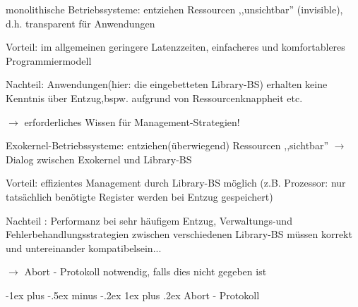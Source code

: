\documentclass[a4paper]{article}
\makeatletter
\renewcommand{\subsubsection}{\@startsection{subsubsection}{3}{0mm}%
 {-1ex plus -.5ex minus -.2ex}%
 {1ex plus .2ex}%
 {\normalfont\small\bfseries}}
\makeatother
\begin{document}
\begin{multicols}{3}
    \begin{itemize*}
        \item
        monolithische Betriebssysteme: entziehen Ressourcen ,,unsichtbar''
        (invisible), d.h. transparent für Anwendungen
        \begin{itemize*}
            \item Vorteil: im allgemeinen geringere Latenzzeiten, einfacheres und komfortableres Programmiermodell
            \item Nachteil: Anwendungen(hier: die eingebetteten Library-BS) erhalten keine Kenntnis über Entzug,bspw. aufgrund von Ressourcenknappheit etc.
            \item $\rightarrow$ erforderliches Wissen für Management-Strategien!
        \end{itemize*}
        \item
        Exokernel-Betriebssysteme: entziehen(überwiegend) Ressourcen
        ,,sichtbar'' $\rightarrow$ Dialog zwischen Exokernel
        und Library-BS
        \begin{itemize*}
            \item Vorteil: effizientes Management durch Library-BS möglich (z.B. Prozessor: nur tatsächlich benötigte Register werden bei Entzug gespeichert)
            \item Nachteil : Performanz bei sehr häufigem Entzug, Verwaltungs-und Fehlerbehandlungsstrategien zwischen verschiedenen Library-BS müssen korrekt und untereinander kompatibelsein...
            \item $\rightarrow$ Abort - Protokoll notwendig, falls dies nicht gegeben ist
        \end{itemize*}
    \end{itemize*}


    \subsubsection{Abort - Protokoll}


\end{multicols}
\end{document}
